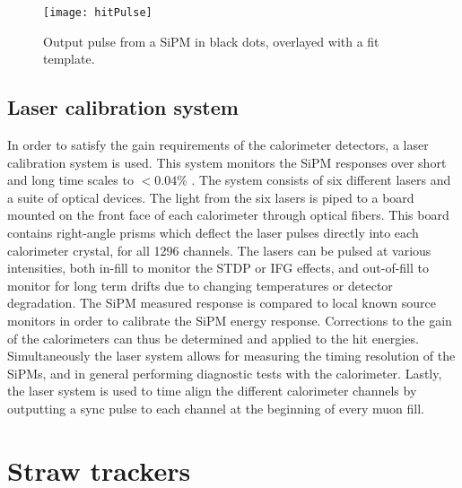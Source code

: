\begin{figure}
\centering
        \texttt{[image: hitPulse]}
\caption[SiPM pulse]{Output pulse from a SiPM in black dots, overlayed with a fit template.}
\label{fig:calopulse}
\end{figure}


\subsection{Laser calibration system}
\label{sub:LaserCalibrationSystem}


In order to satisfy the gain requirements of the calorimeter detectors, a laser calibration system is used. This system monitors the SiPM responses over short and long time scales to $< 0.04\%$ \cite{Anastasi:2017sos}. The system consists of six different lasers and a suite of optical devices. The light from the six lasers is piped to a board mounted on the front face of each calorimeter through optical fibers. This board contains right-angle prisms which deflect the laser pulses directly into each calorimeter crystal, for all 1296 channels. The lasers can be pulsed at various intensities, both in-fill to monitor the STDP or IFG effects, and out-of-fill to monitor for long term drifts due to changing temperatures or detector degradation. The SiPM measured response is compared to local known source monitors in order to calibrate the SiPM energy response. Corrections to the gain of the calorimeters can thus be determined and applied to the hit energies. Simultaneously the laser system allows for measuring the timing resolution of the SiPMs, and in general performing diagnostic tests with the calorimeter. Lastly, the laser system is used to time align the different calorimeter channels by outputting a sync pulse to each channel at the beginning of every muon fill.






\section{Straw trackers}
\label{sec:StrawTrackers}

